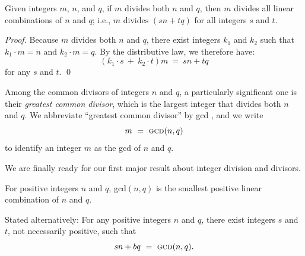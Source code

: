 \begin{prop}
\label{thm:m-common-divisor-nq}
Given integers $m$, $n$, and $q$, if $m$ divides both $n$ and $q$,
then $m$ divides all linear combinations of $n$ and $q$; i.e.,
$m \mbox{ divides } (sn + tq)$ for all integers $s$ and $t$.
\end{prop}

\begin{proof}
Because $m$ divides both $n$ and $q$, there exist integers $k_1$ and
$k_2$ such that $k_1 \cdot m = n$ and $k_2 \cdot m = q$.  By the
distributive law, we therefore have:
\[ (k_1 \cdot s \ + \ k_2 \cdot t)m \ = \ sn+tq \]
for any $s$ and $t$.  \qed
\end{proof}

Among the common divisors of integers $n$ and $q$, a particularly
significant one is their {\em greatest common divisor},
which is the largest integer that divides both $n$ and
$q$.  We abbreviate ``greatest common divisor'' by
 {\sc gcd} , and we write
\[ m \ = \ \mbox{\sc gcd}(n, q) \]
to identify an integer $m$ as the {\sc gcd} of $n$ and $q$.

We are finally ready for our first major result about integer division
and divisors.

\begin{prop}
\label{thm:gcd-n-linear}
For positive integers $n$ and $q$, {\sc gcd}$(n, q)$ is the smallest
positive linear combination of $n$ and $q$.

\noindent
Stated alternatively: For any positive integers $n$ and $q$, there
exist integers $s$ and $t$, not necessarily positive, such that
\[ sn + bq \ = \ \mbox{\sc gcd}(n, q). \]
\end{prop}

